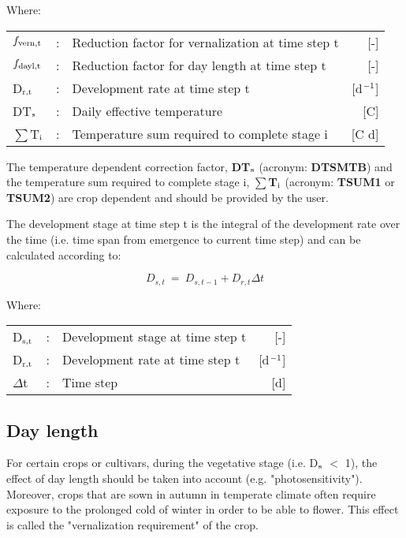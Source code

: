 Where:\\[5pt]
\begin{tabularx}{\textwidth}{llXr}
	$f_{{\rm vern,t}}$ &:& Reduction factor for vernalization at time step t  & [-]\\
	$f_{{\rm dayl,t}}$ &:& Reduction factor for day length at time step t  & [-]\\
	D$_{{\rm r,t}}$ &:& Development rate at time step t  & [d$^{{\rm -1}}$]\\
	DT$_{{\rm s}}$ &:& Daily effective temperature & [\degrees C]\\
	$\sum$T$_{{\rm i}}$ &:& Temperature sum required to complete stage i & [\degrees C d]\\
\end{tabularx}

The temperature dependent correction factor, {\bf DT$_{{\rm s}}$} (acronym: {\bf DTSMTB}) and 
the temperature sum required to complete stage i, {\bf $\sum$T$_{{\rm i}}$} (acronym: 
{\bf TSUM1} or {\bf TSUM2}) are crop dependent and should be provided by the user.

The development stage at time step t is the integral of the development rate over the time
(i.e. time span from emergence to current time step) and can be calculated according to:

\begin{equation}
\label{eq:5.4}
D_{s,t} ~=~ D_{s,t-1} + D_{r,t} \Delta t
\end{equation}

Where:\\[5pt]
\begin{tabularx}{\textwidth}{llXr}
	D$_{{\rm s,t}}$ &:& Development stage at time step t    &    [-]\\
	D$_{{\rm r,t}}$ &:& Development rate at time step t     &   [d$^{{\rm -1}}$]\\
	$\Delta$t &:& Time step   &     [d]\\
\end{tabularx}

\subsection{Day length}

For certain crops or cultivars, during the vegetative stage (i.e. D$_{{\rm s}}$ $<$ 1), the 
effect of day length should be taken into account (e.g. "photosensitivity"). Moreover, crops 
that are sown in autumn
in temperate climate often require exposure to the prolonged cold of winter in order to be
able to flower. This effect is called the "vernalization requirement" of the crop.

